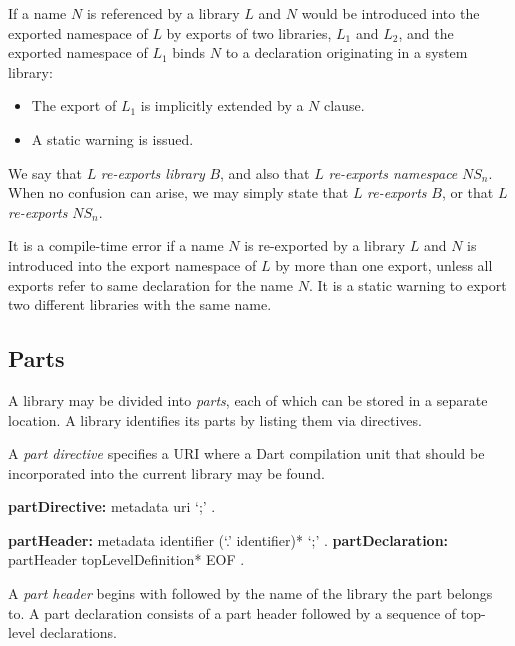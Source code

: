 \documentclass{article}
\newcommand{\code}[1]{{\sf #1}}
\begin{document}
\LMHash{}
If a name $N$ is referenced by a library $L$ and $N$ would be introduced into the exported namespace of $L$ by exports of two libraries, $L_1$ and $L_2$, and the exported namespace of $L_1$ binds $N$ to a declaration originating in a system library:
\begin{itemize}
\item The export of $L_1$ is implicitly extended by a \code{\HIDE{} $N$} clause.
\item A static warning is issued.
\end{itemize}


\LMHash{}
We say that $L$ {\em re-exports library } $B$, and also that $L$ {\em re-exports namespace } $NS_n$. When no confusion can arise, we may simply state that $L$ {\em re-exports }$B$, or that $L$ {\em re-exports }$NS_n$.

\LMHash{}
It is a compile-time error if a name $N$ is re-exported by a library $L$ and $N$ is  introduced into the export namespace of $L$ by more than one export, unless all  exports refer to same declaration for the name $N$.  It is a static warning to export two different libraries with the same name.



\subsection{Parts}

\LMHash{}
A library may be divided into {\em parts}, each of which can be stored in a separate location. A library identifies its parts by listing them via \PART{} directives. 

\LMHash{}
A {\em part directive} specifies a URI where a Dart compilation unit that should be incorporated into the current library may be found.

\begin{grammar}
{\bf partDirective:}
   metadata \PART{}   uri `{\escapegrammar ;}' 
    .

{\bf partHeader:}
      metadata \PART{} \OF{} identifier (`{\escapegrammar .}' identifier)* `{\escapegrammar ;}'
    .
{\bf partDeclaration:}
      partHeader topLevelDefinition* EOF
    .
\end{grammar}

\LMHash{}
A {\em part header} begins with  \PART{} \OF{}  followed by the name of the library the part belongs to.  A part declaration consists of a part header followed by a sequence of top-level declarations.
\end{document}
